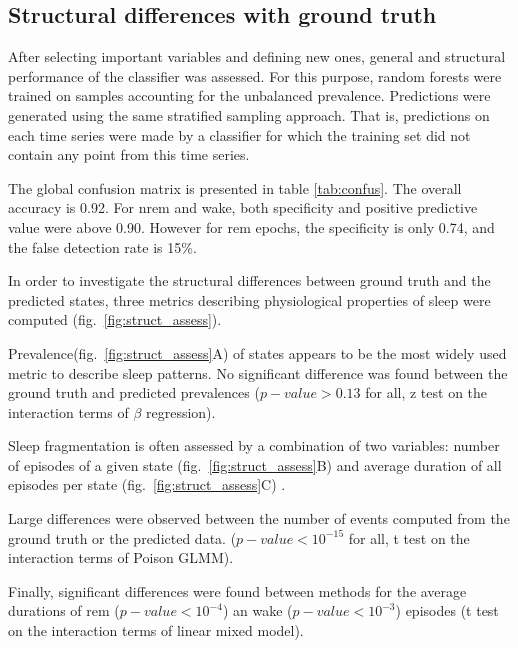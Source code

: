 


\subsection{Structural differences with ground truth}



After selecting important variables and defining new ones, general and structural performance of the classifier was assessed.
For this purpose, random forests were trained on samples accounting for the unbalanced prevalence.
Predictions were generated using the same stratified sampling approach.
That is, predictions on each time series were made by a classifier for which
the training set did not contain any point from this time series.




The global confusion matrix is presented in table \ref{tab:confus}. The overall accuracy is 0.92.
For \gls{nrem} and wake, both specificity and positive predictive value were above 0.90. However
for \gls{rem} epochs, the specificity is only 0.74, and the false detection rate is 15\%.

In order to investigate the structural differences between ground truth and the predicted states,
three metrics describing physiological properties of sleep were computed (fig.~\ref{fig:struct_assess}).

Prevalence(fig.~\ref{fig:struct_assess}A) of states appears to be the most widely used metric to describe sleep patterns\citationneeded{}.
No significant difference was found between the ground truth and predicted prevalences ($p-value > 0.13$ for all, z test on the interaction terms of $\beta$ regression).

Sleep fragmentation is often assessed by a combination of two variables: number of episodes of a given state (fig.~\ref{fig:struct_assess}B) and average duration of all episodes per state (fig.~\ref{fig:struct_assess}C) \citationneeded{}.

Large differences were observed between the number of events computed from the ground truth or the predicted data.
($p-value < 10^{-15}$ for all, t test on the interaction terms of Poison GLMM).

Finally, significant differences were found between methods for the average durations of \gls{rem} ($p-value < 10^{-4}$) an wake ($p-value < 10^{-3}$) episodes
(t test on the interaction terms of linear mixed model).

